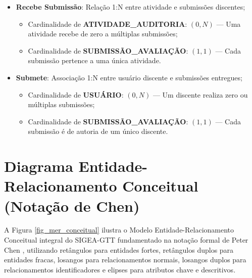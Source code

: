 \begin{itemize}
    \item \textbf{Recebe Submissão}: Relação 1:N entre atividade e submissões discentes;
    \begin{itemize}
        \item Cardinalidade de \textbf{ATIVIDADE\_AUDITORIA}: $(0, N)$ --- Uma atividade recebe de zero a múltiplas submissões;
        \item Cardinalidade de \textbf{SUBMISSÃO\_AVALIAÇÃO}: $(1, 1)$ --- Cada submissão pertence a uma única atividade.
    \end{itemize}

    \item \textbf{Submete}: Associação 1:N entre usuário discente e submissões entregues;
    \begin{itemize}
        \item Cardinalidade de \textbf{USUÁRIO}: $(0, N)$ --- Um discente realiza zero ou múltiplas submissões;
        \item Cardinalidade de \textbf{SUBMISSÃO\_AVALIAÇÃO}: $(1, 1)$ --- Cada submissão é de autoria de um único discente.
    \end{itemize}
\end{itemize}

\section{Diagrama Entidade-Relacionamento Conceitual (Notação de Chen)}
\label{sec_diagrama_mer_chen}

A Figura \ref{fig_mer_conceitual} ilustra o Modelo Entidade-Relacionamento Conceitual integral do SIGEA-GTT fundamentado na notação formal de Peter Chen \cite{chen1976}, utilizando retângulos para entidades fortes, retângulos duplos para entidades fracas, losangos para relacionamentos normais, losangos duplos para relacionamentos identificadores e elipses para atributos chave e descritivos.


